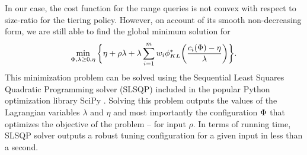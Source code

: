 In our case, the cost function for the range queries is not convex with respect
    to size-ratio {\sizeratio} for the tiering policy.
However, on account of its smooth non-decreasing form, we are still able
    to find the global minimum solution for 
\begin{eqnarray}
\min_{{{\Phi}}, \lambda \geq 0, \eta}
\bigg\{\eta + \rho \lambda + \lambda
    \sum_{i=1}^{m}w_i\phi_{KL}^* \bigg(\frac{c_i({{\Phi}}) -
\eta}{\lambda}\bigg)\bigg\}.
\end{eqnarray}
This minimization problem can be solved using the 
    Sequential Least Squares Quadratic Programming solver (SLSQP) included in 
    the popular Python optimization library SciPy \cite{2020SciPy-NMeth}.
Solving this problem outputs the values of the Lagrangian variables $\lambda$ 
    and $\eta$ and most importantly the configuration ${{\Phi}}$ that 
    optimizes the objective of the {\robustw} problem -- for input $\rho$.
In terms of running time, SLSQP solver outputs a robust tuning configuration 
    for a given input in less than a second.



